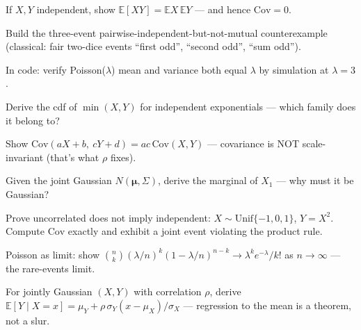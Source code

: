 \begin{exercise}[easy]
If $X,Y$ independent, show $\mathbb E[XY]=\mathbb EX\,\mathbb EY$ ---
and hence $\mathrm{Cov}=0$.
\end{exercise}

\begin{exercise}[medium]
Build the three-event pairwise-independent-but-not-mutual counterexample
(classical: fair two-dice events ``first odd'', ``second odd'', ``sum
odd'').
\end{exercise}

\begin{exercise}[medium]
In code: verify Poisson($\lambda$) mean and variance both equal $\lambda$
by simulation at $\lambda=3$.
\end{exercise}

\begin{exercise}[medium]
Derive the cdf of $\min(X,Y)$ for independent exponentials --- which
family does it belong to?
\end{exercise}

\begin{exercise}[medium]
Show $\mathrm{Cov}(aX+b,\ cY+d)=ac\,\mathrm{Cov}(X,Y)$ --- covariance is
NOT scale-invariant (that's what $\rho$ fixes).
\end{exercise}

\begin{exercise}[medium]
Given the joint Gaussian $N(\boldsymbol\mu,\Sigma)$, derive the marginal
of $X_1$ --- why must it be Gaussian?
\end{exercise}

\begin{exercise}[hard]
Prove uncorrelated does not imply independent: $X\sim
\mathrm{Unif}\{-1,0,1\}$, $Y=X^{2}$. Compute $\mathrm{Cov}$ exactly and
exhibit a joint event violating the product rule.
\end{exercise}

\begin{exercise}[hard]
Poisson as limit: show
$\binom nk(\lambda/n)^{k}(1-\lambda/n)^{n-k}\to
\lambda^{k}e^{-\lambda}/k!$ as $n\to\infty$ --- the rare-events limit.
\end{exercise}

\begin{exercise}[hard]
For jointly Gaussian $(X,Y)$ with correlation $\rho$, derive
$\mathbb E[Y\mid X=x]=\mu_Y+\rho\,\sigma_Y(x-\mu_X)/\sigma_X$ ---
regression to the mean is a theorem, not a slur.
\end{exercise}

